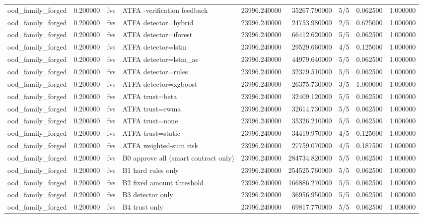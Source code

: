 \begin{tabular}{lrllrrlrr}
ood\_family\_forged & 0.200000 & fvs & ATFA -verification feedback & 23996.240000 & 35267.790000 & 5/5 & 0.062500 & 1.000000 \\
ood\_family\_forged & 0.200000 & fvs & ATFA detector=hybrid & 23996.240000 & 24753.980000 & 2/5 & 0.625000 & 1.000000 \\
ood\_family\_forged & 0.200000 & fvs & ATFA detector=iforest & 23996.240000 & 66412.620000 & 5/5 & 0.062500 & 1.000000 \\
ood\_family\_forged & 0.200000 & fvs & ATFA detector=lstm & 23996.240000 & 29529.660000 & 4/5 & 0.125000 & 1.000000 \\
ood\_family\_forged & 0.200000 & fvs & ATFA detector=lstm\_ae & 23996.240000 & 44979.640000 & 5/5 & 0.062500 & 1.000000 \\
ood\_family\_forged & 0.200000 & fvs & ATFA detector=rules & 23996.240000 & 32379.510000 & 5/5 & 0.062500 & 1.000000 \\
ood\_family\_forged & 0.200000 & fvs & ATFA detector=xgboost & 23996.240000 & 26375.730000 & 3/5 & 1.000000 & 1.000000 \\
ood\_family\_forged & 0.200000 & fvs & ATFA trust=beta & 23996.240000 & 32409.120000 & 5/5 & 0.062500 & 1.000000 \\
ood\_family\_forged & 0.200000 & fvs & ATFA trust=ewma & 23996.240000 & 32614.730000 & 5/5 & 0.062500 & 1.000000 \\
ood\_family\_forged & 0.200000 & fvs & ATFA trust=none & 23996.240000 & 35326.210000 & 5/5 & 0.062500 & 1.000000 \\
ood\_family\_forged & 0.200000 & fvs & ATFA trust=static & 23996.240000 & 34419.970000 & 4/5 & 0.125000 & 1.000000 \\
ood\_family\_forged & 0.200000 & fvs & ATFA weighted-sum risk & 23996.240000 & 27759.070000 & 4/5 & 0.187500 & 1.000000 \\
ood\_family\_forged & 0.200000 & fvs & B0 approve all (smart contract only) & 23996.240000 & 284734.820000 & 5/5 & 0.062500 & 1.000000 \\
ood\_family\_forged & 0.200000 & fvs & B1 hard rules only & 23996.240000 & 254525.760000 & 5/5 & 0.062500 & 1.000000 \\
ood\_family\_forged & 0.200000 & fvs & B2 fixed amount threshold & 23996.240000 & 166886.270000 & 5/5 & 0.062500 & 1.000000 \\
ood\_family\_forged & 0.200000 & fvs & B3 detector only & 23996.240000 & 36956.950000 & 5/5 & 0.062500 & 1.000000 \\
ood\_family\_forged & 0.200000 & fvs & B4 trust only & 23996.240000 & 69817.770000 & 5/5 & 0.062500 & 1.000000 \\

\end{tabular}
